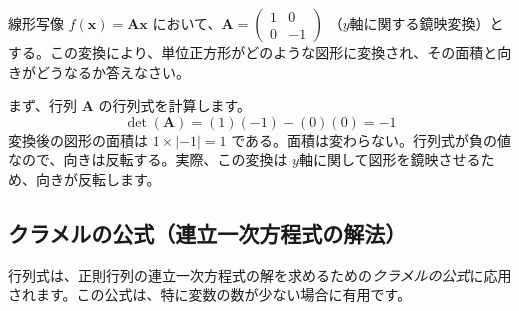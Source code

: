 \begin{ex}
線形写像 $f(\bm{x}) = \bm{A}\bm{x}$ において、$\bm{A} = \begin{pmatrix} 1 & 0 \\ 0 & -1 \end{pmatrix}$ （$y$軸に関する鏡映変換）とする。この変換により、単位正方形がどのような図形に変換され、その面積と向きがどうなるか答えなさい。\par
まず、行列 $\bm{A}$ の行列式を計算します。
\[ \det(\bm{A}) = (1)(-1) - (0)(0) = -1 \]
変換後の図形の面積は $1 \times |-1| = 1$ である。面積は変わらない。行列式が負の値なので、向きは反転する。実際、この変換は $y$軸に関して図形を鏡映させるため、向きが反転します。
\end{ex}

\subsection{クラメルの公式（連立一次方程式の解法）}

行列式は、正則行列の連立一次方程式の解を求めるための\emph{クラメルの公式}に応用されます。この公式は、特に変数の数が少ない場合に有用です。

